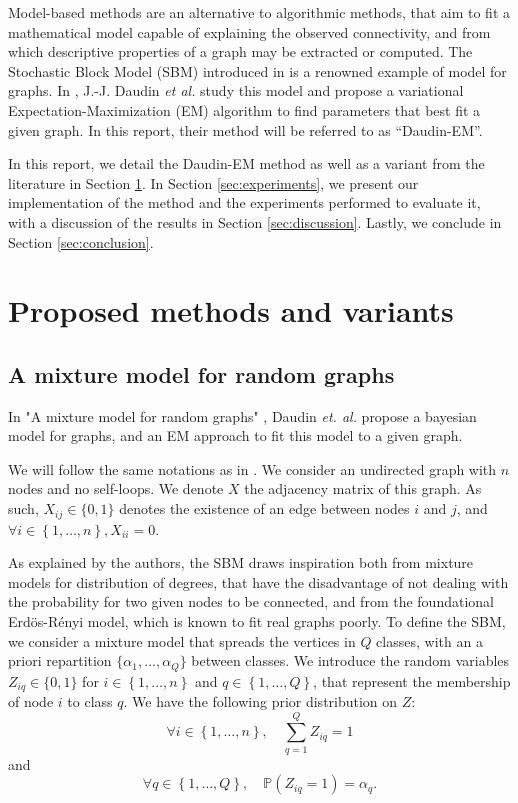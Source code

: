 \documentclass[switch, 12pt]{article}
\begin{document}
\begin{multicols}{2}
    Model-based methods are an alternative to algorithmic methods, that aim to fit a mathematical model capable of explaining the observed connectivity, and from which descriptive properties of a graph may be extracted or computed. The Stochastic Block Model (SBM) introduced in \cite{snijders_estimation_1997} is a renowned example of model for graphs. In \cite{main_article}, J.-J. Daudin \textit{et al.} study this model and propose a variational Expectation-Maximization (EM) algorithm to find parameters that best fit a given graph. In this report, their method will be referred to as ``Daudin-EM''.

    In this report, we detail the Daudin-EM method as well as a variant from the literature in Section \ref{sec:method}. In Section \ref{sec:experiments}, we present our implementation of the method and the experiments performed to evaluate it, with a discussion of the results in Section \ref{sec:discussion}. Lastly, we conclude in Section \ref{sec:conclusion}.


    \section{Proposed methods and variants}
    \label{sec:method}

    \subsection{A mixture model for random graphs \cite{main_article}}
    \label{subsec:mixture_model}
    In "A mixture model for random graphs" \cite{main_article}, Daudin \textit{et. al.} propose a bayesian model for graphs, and an EM approach to fit this model to a given graph.

    We will follow the same notations as in \cite{main_article}. We consider an undirected graph with $n$ nodes and no self-loops. We denote $X$ the adjacency matrix of this graph. As such, $X_{ij}\in \{0,1\}$ denotes the existence of an edge between nodes $i$ and $j$, and $\forall i\in \left\{1,\dots,n\right\}, X_{ii}=0$.

    As explained by the authors, the SBM draws inspiration both from mixture models for distribution of degrees, that have the disadvantage of not dealing with the probability for two given nodes to be connected, and from the foundational Erdös-Rényi model, which is known to fit real graphs poorly. To define the SBM, we consider a mixture model that spreads the vertices in $Q$ classes, with an a priori repartition $\{\alpha_1, \dots, \alpha_Q\}$ between classes. We introduce the random variables $Z_{iq} \in \{0,1\}$ for $i\in \left\{1,\dots,n\right\}$ and $q\in \left\{1,\dots,Q\right\}$, that represent the membership of node $i$ to class $q$. We have the following prior distribution on $Z$:
    \begin{equation}
        \forall i\in \left\{1,\dots,n\right\}, \quad \sum_{q=1}^Q Z_{iq} = 1
    \end{equation}
    and
    \begin{equation}
        \label{eq:prior_Z}
        \forall q\in \left\{1,\dots,Q\right\},\quad \mathbb{P}(Z_{iq}=1)=\alpha_q.
    \end{equation}


\end{multicols}
\end{document}

